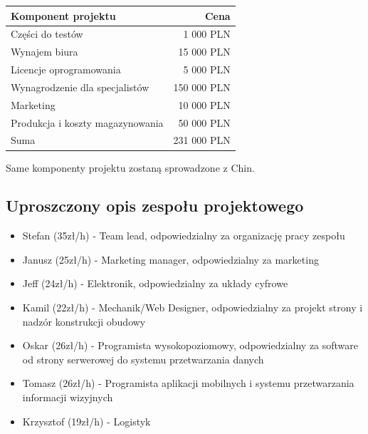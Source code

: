 \documentclass[12pt]{article}
\begin{document}
\begin{table}[!h]
	\centering
	\begin{tabular}{l|r}
		Komponent projektu & Cena \\\hline
		
		Części do testów & 1 000 PLN \\
		
		Wynajem biura & 15 000 PLN \\
		
		Licencje oprogramowania & 5 000 PLN \\
		
		Wynagrodzenie dla specjalistów & 150 000 PLN \\
		
		Marketing & 10 000 PLN \\
		
		Produkcja i koszty magazynowania & 50 000 PLN \\
		
		\hline
		Suma & 231 000 PLN
		
	\end{tabular}
	
\end{table}

Same komponenty projektu zostaną sprowadzone z Chin.



\subsection{Uproszczony opis zespołu projektowego}

\begin{itemize}
	
\item Stefan (35zł/h) - Team lead, odpowiedzialny za organizację pracy zespołu

\item Janusz (25zł/h) - Marketing manager, odpowiedzialny za marketing 

\item Jeff (24zł/h) - Elektronik, odpowiedzialny za układy cyfrowe

\item Kamil (22zł/h) - Mechanik/Web Designer, odpowiedzialny za projekt strony i nadzór konstrukcji obudowy

\item Oskar (26zł/h) - Programista wysokopoziomowy, odpowiedzialny za software od strony serwerowej do systemu przetwarzania danych

\item Tomasz (26zł/h) - Programista aplikacji mobilnych i systemu przetwarzania informacji wizyjnych

\item Krzysztof (19zł/h) - Logistyk 

\end{itemize}
\end{document}
